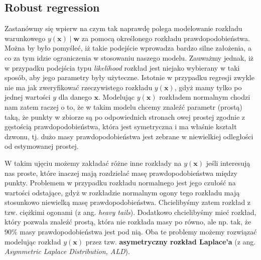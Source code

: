 \documentclass{myclass}
\numberwithin{equation}{subsection}
\begin{document}
\subsection{Robust regression}

Zastanówmy się wpierw na czym tak naprawdę polega modelowanie rozkładu warunkowego \(y(\mathbf{x})
\mid \mathbf{w}\) za pomocą określonego rozkładu prawdopodobieństwa. Można by było pomyśleć, iż
takie podejście wprowadza bardzo silne założenia, a co za tym idzie ograniczenia w stosowaniu
naszego modelu. Zauważmy jednak, iż w przypadku podejścia typu \textit{likelihood} rozkład jest
niejako wybierany w taki sposób, aby jego parametry były użyteczne. Istotnie w przypadku regresji
zwykle nie ma jak zweryfikować rzeczywistego rozkładu \(y(\mathbf{x})\), gdyż mamy tylko po jednej
wartości \(y\) dla danego \(\mathbf{x}\). Modelując \(y(\mathbf{x})\) rozkładem normalnym chodzi nam
zatem raczej o to, że w takim modelu chcemy znaleźć parametr (prostą) taką, że punkty w zbiorze są
po odpowiednich stronach owej prostej zgodnie z gęstością prawdopodobieństwa, która jest symetryczna
i ma właśnie kształt dzwonu, tj. dużo masy prawdopodobieństwa jest zebrane w niewielkiej odległości
od estymowanej prostej.

W takim ujęciu możemy zakładać różne inne rozkłady na \(y(\mathbf{x})\) jeśli interesują nas proste,
które inaczej mają rozdzielać masę prawdopodobieństwa między punkty. Problemem w przypadku rozkładu
normalnego jest jego czułość na wartości odstające, gdyż w rozkładzie normalnym ogony tego rozkładu
mają stosunkowo niewielką masę prawdopodobieństwa. Chcielibyśmy zatem rozkład z tzw. ciężkimi
ogonami (z ang. \textit{heavy tails}). Dodatkowo chcielibyśmy mieć rozkład, który pozwala znaleźć
prostą, która nie rozkłada masy po równo, ale np. tak, że 90\% masy prawdopodobieństwa jest pod nią.
Oba te problemy możemy rozwiązać modelując rozkład \(y(\mathbf{x})\) przez tzw. \textbf{asymetryczny
rozkład Laplace'a} (z ang. \textit{Asymmetric Laplace Distribution, ALD}).
\end{document}
